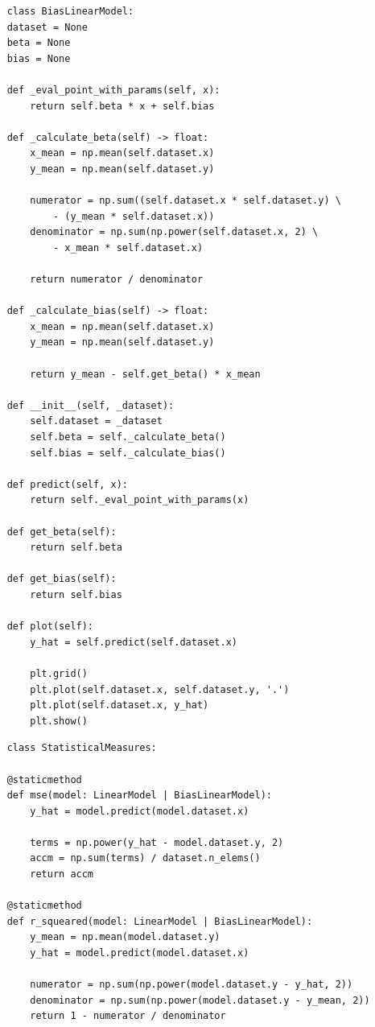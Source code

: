 \documentclass{report}
\begin{document}
    \begin{lstlisting}
    class BiasLinearModel:
    dataset = None
    beta = None
    bias = None

    def _eval_point_with_params(self, x):
        return self.beta * x + self.bias

    def _calculate_beta(self) -> float:
        x_mean = np.mean(self.dataset.x)
        y_mean = np.mean(self.dataset.y)

        numerator = np.sum((self.dataset.x * self.dataset.y) \
            - (y_mean * self.dataset.x))
        denominator = np.sum(np.power(self.dataset.x, 2) \
            - x_mean * self.dataset.x)

        return numerator / denominator

    def _calculate_bias(self) -> float:
        x_mean = np.mean(self.dataset.x)
        y_mean = np.mean(self.dataset.y)

        return y_mean - self.get_beta() * x_mean

    def __init__(self, _dataset):
        self.dataset = _dataset
        self.beta = self._calculate_beta()
        self.bias = self._calculate_bias()

    def predict(self, x):
        return self._eval_point_with_params(x)

    def get_beta(self):
        return self.beta

    def get_bias(self):
        return self.bias

    def plot(self):
        y_hat = self.predict(self.dataset.x)

        plt.grid()
        plt.plot(self.dataset.x, self.dataset.y, '.')
        plt.plot(self.dataset.x, y_hat)
        plt.show()
    \end{lstlisting}

    \subtitle{Medidas estad\'isticas usadas para entender nuestra funci\'on de p\'erdida/errores:}
    \begin{lstlisting}
    class StatisticalMeasures:

    @staticmethod
    def mse(model: LinearModel | BiasLinearModel):
        y_hat = model.predict(model.dataset.x)

        terms = np.power(y_hat - model.dataset.y, 2)
        accm = np.sum(terms) / dataset.n_elems()
        return accm

    @staticmethod
    def r_squeared(model: LinearModel | BiasLinearModel):
        y_mean = np.mean(model.dataset.y)
        y_hat = model.predict(model.dataset.x)

        numerator = np.sum(np.power(model.dataset.y - y_hat, 2))
        denominator = np.sum(np.power(model.dataset.y - y_mean, 2))
        return 1 - numerator / denominator
    \end{lstlisting}
\end{document}
